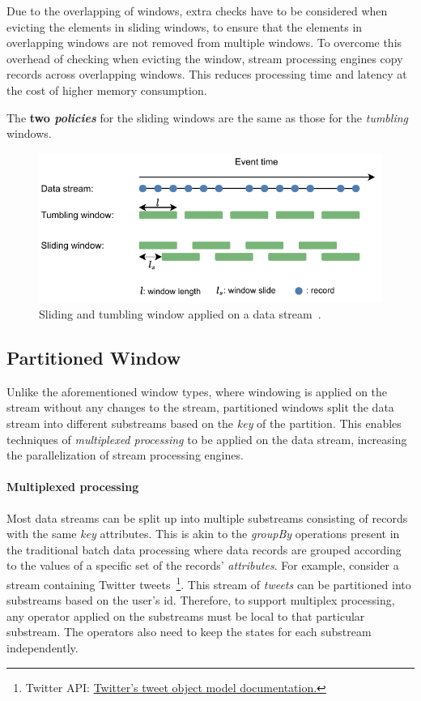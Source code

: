 Due to the overlapping of windows, extra checks have to be considered 
when evicting the elements in sliding windows, to ensure that the elements in 
overlapping windows are not removed from multiple windows. To overcome this overhead 
of checking when evicting the window, 
stream processing engines copy records across overlapping windows. 
This reduces processing time and latency at the cost of higher memory consumption.

The \textbf{two \emph{policies}} for the sliding windows are the same as those for the \emph{tumbling} windows. 

\begin{figure}[htpb]
    \centering
    \includegraphics[width=0.8\linewidth]{fig/slide_tumb_windows.pdf}
    \caption{Sliding and tumbling window applied on a data stream~\cite{jonas_scotty}. }%
    \label{fig:slide_tumb_window}
\end{figure}


\subsection{Partitioned Window}%
\label{sec:Partitioned Window}

Unlike the aforementioned window types, where windowing is applied on the stream 
without any changes to the stream, partitioned windows split the data stream into 
different substreams based on the \emph{key} of the partition. This enables 
techniques of \emph{multiplexed processing} to be applied on the data stream, increasing 
the parallelization of stream processing engines. 

\paragraph{Multiplexed processing}%
\label{par:Multiplexed processing}
Most data streams can be split up into multiple substreams consisting of records 
with the same \emph{key} attributes. This is akin to 
the \emph{groupBy} operations present in the traditional batch data processing where 
data records are grouped according to the values of a specific set of the records' \emph{attributes}.
For example, consider a stream containing 
Twitter tweets~\footnote{Twitter API: \href{https://developer.twitter.com/en/docs/twitter-api/v1/data-dictionary/object-model/tweet}
{Twitter's tweet object model documentation.}}. This stream of \emph{tweets} can be 
partitioned into substreams based on the user's id. 
Therefore, to support multiplex processing, any operator applied on the substreams 
must be local to that particular substream. The operators also need to keep the states for each 
substream independently. 


